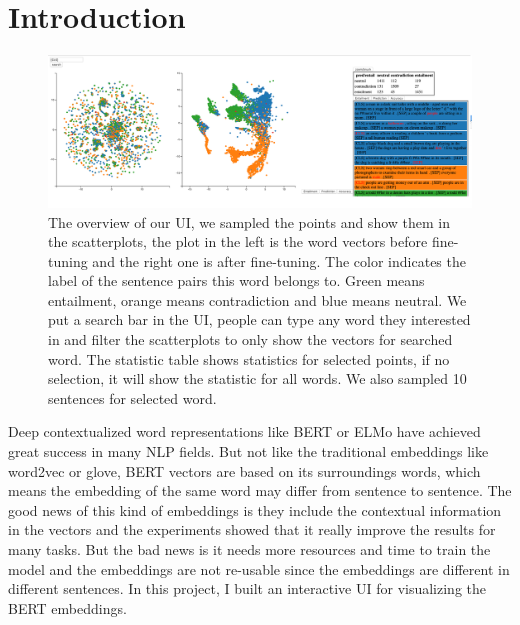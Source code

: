\section{Introduction}
\begin{figure}[h]
\centering
\includegraphics[width=.80\textwidth]{figs/fig1.png}
\vspace{-2mm}
\caption{
The overview of our UI, we sampled the points and show them in the scatterplots, the plot in the left is the word vectors before fine-tuning and the right one is after fine-tuning. The color indicates the label of the sentence pairs this word belongs to. Green means entailment, orange means contradiction and blue means neutral. We put a search bar in the UI, people can type any word they interested in and filter the scatterplots to only show the vectors for searched word. The statistic table shows statistics for selected points, if no selection, it will show the statistic for all words. We also sampled 10 sentences for selected word.
}
\label{fig:mainui}
\end{figure}
Deep contextualized word representations like BERT or ELMo have achieved great success in many NLP fields. But not like the traditional embeddings like word2vec or glove, BERT vectors are based on its surroundings words, which means the embedding of the same word may differ from sentence to sentence. The good news of this kind of embeddings is they include the contextual information in the vectors and the experiments showed that it really improve the results for many tasks. But the bad news is it needs more resources and time to train the model and the embeddings are not re-usable since the embeddings are different in different sentences. In this project, I built an interactive UI for visualizing the BERT embeddings.